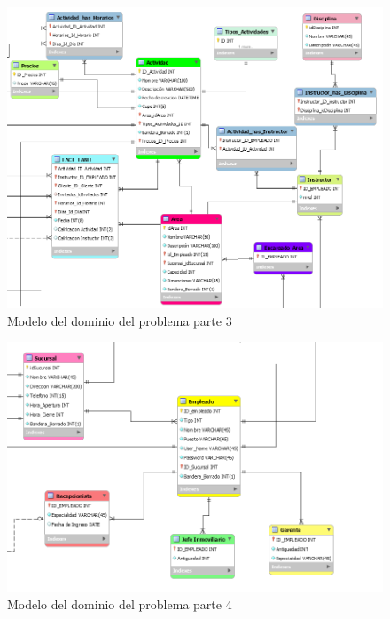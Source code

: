 \begin{figure}[htbp!]
	\begin{center}
		\includegraphics[angle=90,width=.95\textwidth]{images/BD/bd3}
		\caption{Modelo del dominio del problema parte 3}
		
	\end{center}
\end{figure}

\begin{figure}[htbp!]
	\begin{center}
		\includegraphics[angle=90,width=.7\textwidth]{images/BD/bd4}
		\caption{Modelo del dominio del problema parte 4}
		
	\end{center}
\end{figure}

